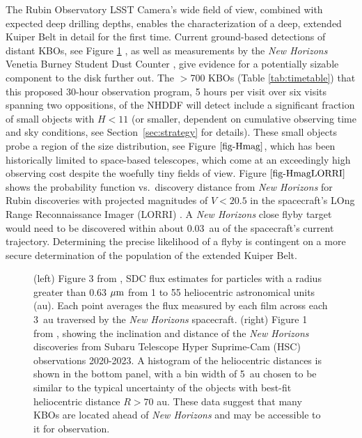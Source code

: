 \documentclass[modern,linenumbers,trackchanges,preprint]{aastex631}
\begin{document}
The Rubin Observatory LSST Camera's wide field of view, combined with expected deep drilling depths, enables the characterization of a deep, extended Kuiper Belt in detail for the first time. Current ground-based detections of distant KBOs, see Figure \ref{fig-KBOsPlot} \citep{Fraser2024LPI, Yoshida2024}, as well as measurements by the {\it New Horizons} Venetia Burney Student Dust Counter \citep[SDC,][]{Doner2024}, give evidence for a potentially sizable component to the disk further out. 
The $>$700 KBOs (Table \ref{tab:timetable}) that this proposed 30-hour observation program, 5 hours per visit over six visits spanning two oppositions, of the NHDDF will detect include a significant fraction of small objects with $H<11$ (or smaller, dependent on cumulative observing time and sky conditions, see Section~\ref{sec:strategy} for details).
These small objects probe a region of the size distribution, see Figure $\ref{fig-Hmag}$, which has been historically limited to space-based telescopes, which come at an exceedingly high observing cost despite the woefully tiny fields of view.  
Figure $\ref{fig-HmagLORRI}$ shows the probability function vs.\ discovery distance from {\it New Horizons} for Rubin discoveries with projected magnitudes of $V<20.5$ in the spacecraft's LOng Range Reconnaissance Imager (LORRI) \citep{2008SSRv..140..189C,2020PASP..132c5003W}. A \textit{New Horizons} close flyby target would need to be discovered within about 0.03~au of the spacecraft's current trajectory. Determining the precise likelihood of a flyby is contingent on a more secure determination of the population of the extended Kuiper Belt.

\begin{figure}
\caption{\label{fig-KBOsPlot}(left) Figure 3 from \citet[][used with permission]{Doner2024}, SDC flux estimates for particles with a radius greater than 0.63 $\mbox{$\mu$m} $ from 1 to 55 heliocentric astronomical units (au). Each point averages the flux measured by each film across each 3~au traversed by the {\it New Horizons} spacecraft. (right) Figure 1 from \citet[][used with permission]{Fraser2024LPI}, showing the inclination and distance of the {\it New Horizons} discoveries from Subaru Telescope Hyper Suprime-Cam (HSC) observations 2020-2023. A histogram of the heliocentric distances is shown in the bottom panel, with a bin width of 5~au chosen to be similar to the typical uncertainty of the objects with best-fit heliocentric distance $R > 70$ au. These data suggest that many KBOs are located ahead of {\it New Horizons} and may be accessible to it for observation.}

\end{figure}
\end{document}
